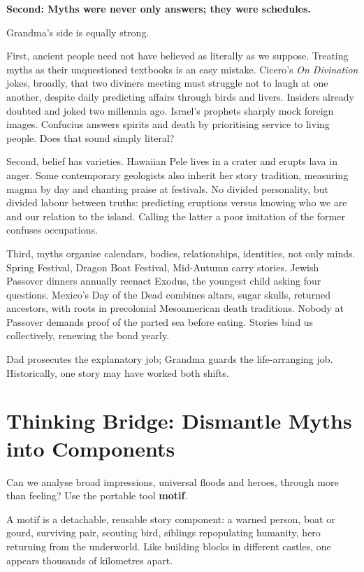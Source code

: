 \textbf{Second: Myths were never only answers; they were schedules.}

Grandma's side is equally strong.

First, ancient people need not have believed as literally as we suppose. Treating myths as their unquestioned textbooks is an easy mistake. Cicero's \textit{On Divination} jokes, broadly, that two diviners meeting must struggle not to laugh at one another, despite daily predicting affairs through birds and livers. Insiders already doubted and joked two millennia ago. Israel's prophets sharply mock foreign images. Confucius answers spirits and death by prioritising service to living people. Does that sound simply literal?

Second, belief has varieties. Hawaiian Pele lives in a crater and erupts lava in anger. Some contemporary geologists also inherit her story tradition, measuring magma by day and chanting praise at festivals. No divided personality, but divided labour between truths: predicting eruptions versus knowing who we are and our relation to the island. Calling the latter a poor imitation of the former confuses occupations.

Third, myths organise calendars, bodies, relationships, identities, not only minds. Spring Festival, Dragon Boat Festival, Mid-Autumn carry stories. Jewish Passover dinners annually reenact Exodus, the youngest child asking four questions. Mexico's Day of the Dead combines altars, sugar skulls, returned ancestors, with roots in precolonial Mesoamerican death traditions. Nobody at Passover demands proof of the parted sea before eating. Stories bind us collectively, renewing the bond yearly.

Dad prosecutes the explanatory job; Grandma guards the life-arranging job. Historically, one story may have worked both shifts.

\section[Thinking Bridge: Take Myths Apart]{Thinking Bridge: Dismantle Myths into Components}
Can we analyse broad impressions, universal floods and heroes, through more than feeling? Use the portable tool \textbf{motif}.

A motif is a detachable, reusable story component: a warned person, boat or gourd, surviving pair, scouting bird, siblings repopulating humanity, hero returning from the underworld. Like building blocks in different castles, one appears thousands of kilometres apart.


